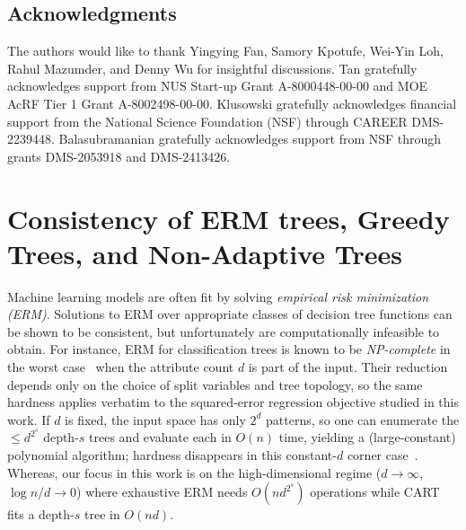 \documentclass[11pt]{article}
\newcommand{\comment}[2]{{#2}}
\begin{document}
\subsection*{Acknowledgments}

The authors would like to thank Yingying Fan, Samory Kpotufe, Wei-Yin Loh, Rahul Mazumder, and Denny Wu for insightful discussions. Tan gratefully acknowledges support from NUS Start-up Grant A-8000448-00-00 and MOE AcRF Tier 1 Grant A-8002498-00-00. Klusowski gratefully acknowledges financial support from the National Science Foundation (NSF) through CAREER DMS-2239448. Balasubramanian gratefully acknowledges support from NSF through grants DMS-2053918 and DMS-2413426.

\clearpage


\appendix
\appendix
{}


\section{Consistency of ERM trees, Greedy Trees, and Non-Adaptive Trees}\label{sec:additionalrelwork}

Machine learning models are often fit by solving \emph{empirical risk minimization (ERM)}.
Solutions to ERM over appropriate classes of decision tree functions can be shown to be consistent, but unfortunately are computationally infeasible to obtain.
\comment{red}{For instance, ERM for classification trees is known to be \emph{NP-complete} in the worst case~\citep{laurent1976constructing}  when the attribute count $d$ is part of the input. Their reduction depends only on the choice of split variables and tree topology, so the same hardness applies verbatim to the squared‐error regression objective studied in this work. If $d$ is fixed, the input space has only $2^{d}$ patterns, so one can enumerate the $\le d^{2^{s}}$ depth-$s$ trees and evaluate each in $O(n)$ time, yielding a (large-constant) polynomial algorithm; hardness disappears in this constant-$d$ corner case~\citep{donoho1997cart,chatterjee2021adaptive}. Whereas, our focus in this work is on the high-dimensional regime ($d\to\infty$, $\log n/d\to0$) where exhaustive ERM needs $O(n d^{2^{s}})$ operations while CART fits a depth-$s$ tree in $O(nd)$.}
\end{document}
